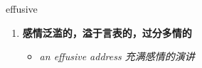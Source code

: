 
\begin{frame}
{\huge effusive}
\begin{center}
\begin{enumerate}\Large
  \item \textbf{感情泛滥的，溢于言表的，过分多情的}
  \begin{itemize}
    \item \em{\Large{an effusive address 充满感情的演讲}}
  \end{itemize}
\end{enumerate}
\end{center}
\end{frame}
